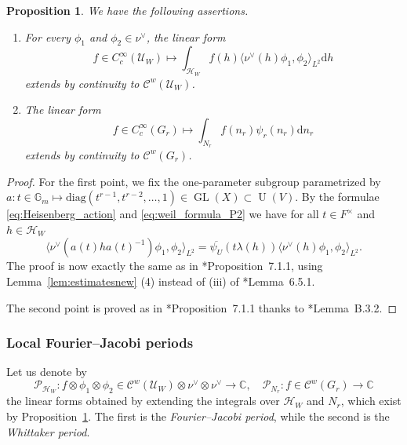 \documentclass[letterpaper,11pt]{amsart}
\newcommand{\bG}{\mathbb{G}}
\newcommand{\C}{\mathbb{C}}
\newcommand{\cC}{\mathcal{C}}
\newcommand{\cH}{\mathcal{H}}
\newcommand{\cP}{\mathcal{P}}
\newcommand{\cU}{\mathcal{U}}
\newcommand{\rd}{\mathrm{d}}
\newcommand{\<}{\negthickspace}
\DeclareMathOperator{\GL}{GL}
\DeclareMathOperator{\U}{U}
\theoremstyle{definition}
\theoremstyle{plain}
\newtheorem{prop}[definition]{Proposition}
\theoremstyle{remark}
\numberwithin{equation}{section}
\begin{document}
\begin{prop}
    \label{prop:extension_continuity}
    We have the following assertions.
    \begin{enumerate}
    \item For every $\phi_1$ and $\phi_2 \in \nu^\vee$, the linear form
    \begin{equation*}
    f \in C_c^\infty(\cU_W) \mapsto \int_{\cH_W} f(h) \langle\nu^\vee(h) \phi_1, \phi_2\rangle_{L^2} \rd h
    \end{equation*}
    extends by continuity to $\cC^w(\cU_W)$.
    \item The linear form
    \begin{equation*}
        f \in C_c^\infty(G_r) \mapsto \int_{N_r} f(n_r) \psi_r(n_r) \rd n_r
    \end{equation*}
    extends by continuity to $\cC^w(G_r)$.
    \end{enumerate}
    \end{prop}

    \begin{proof}
        For the first point, we fix the one-parameter subgroup parametrized by $a : t \in \bG_m \mapsto \mathrm{diag}(t^{r-1},t^{r-2}, \hdots, 1) \in \GL(X) \subset \U(V)$. By the formulae \eqref{eq:Heisenberg_action} and \eqref{eq:weil_formula_P2} we have for all $t \in F^\times$ and $h \in \cH_W$
        \begin{equation*}
            \langle \nu^\vee(a(t)ha(t)^{-1}) \phi_1, \phi_2 \rangle_{L^2}=\overline{\psi_U}(t \lambda(h)) \langle \nu^\vee(h) \phi_1, \phi_2 \rangle_{L^2}.
        \end{equation*}
        The proof is now exactly the same as in \cite{BP2}*{Proposition~7.1.1}, using Lemma~\ref{lem:estimatesnew} (4) instead of (iii) of \cite{BP2}*{Lemma~6.5.1}.

        The second point is proved as in \cite{BP2}*{Proposition~7.1.1} thanks to \cite{BP2}*{Lemma~B.3.2}.
    \end{proof}

    \subsubsection{Local Fourier--Jacobi periods}
    \label{subsec:local_FJ_periods_defi}

    Let us denote by
    \begin{equation*}
        \cP_{\cH_W} : f \otimes \phi_1 \otimes \phi_2 \in \cC^w(\cU_W) \otimes \nu^\vee \otimes \nu^\vee \to \C, \quad \cP_{N_r} : f \in \cC^w(G_r) \to \C 
    \end{equation*}
    the linear forms obtained by extending the integrals over $\cH_W$ and $N_r$, which exist by Proposition~\ref{prop:extension_continuity}. The first is the \emph{Fourier--Jacobi period}, while the second is the \emph{Whittaker period}. 
\end{document}
